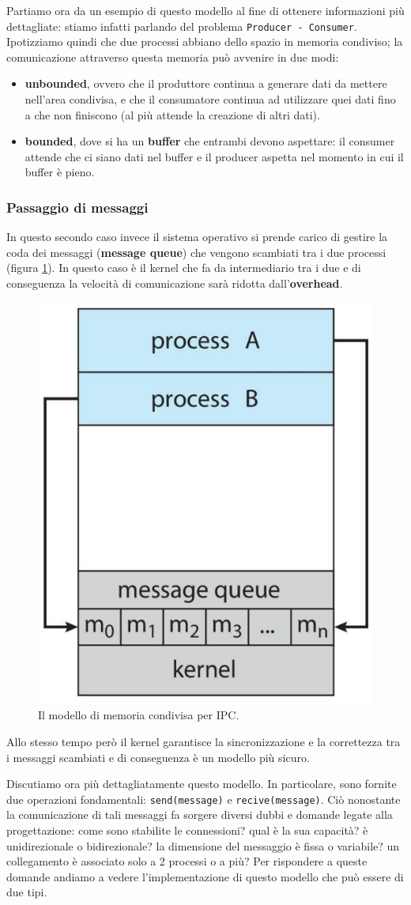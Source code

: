 Partiamo ora da un esempio di questo modello al fine di ottenere informazioni più dettagliate: stiamo infatti parlando del problema \texttt{Producer - Consumer}. Ipotizziamo quindi che due processi abbiano dello spazio in memoria condiviso; la comunicazione attraverso questa memoria può avvenire in due modi:
\vspace{-5px}
\begin{itemize}
\setlength{\itemsep}{-.15 em}
    \item \textbf{unbounded}, ovvero che il produttore continua a generare dati da mettere nell'area condivisa, e che il consumatore continua ad utilizzare quei dati fino a che non finiscono (al più attende la creazione di altri dati).
    \item \textbf{bounded}, dove si ha un \textbf{buffer} che entrambi devono aspettare: il consumer attende che ci siano dati nel buffer e il producer aspetta nel momento in cui il buffer è pieno. 
\end{itemize}

% 
\subsubsection{Passaggio di messaggi}
In questo secondo caso invece il sistema operativo si prende carico di gestire la coda dei messaggi (\textbf{message queue}) che vengono scambiati tra i due processi (figura \ref{fig:message_passing}). In questo caso è il kernel che fa da intermediario tra i due e di conseguenza la velocità di comunicazione sarà ridotta dall'\textbf{overhead}.
\begin{figure}[h]
    \centering
    \includegraphics[width = .25\textwidth]{../res/imgs/processes/message_passing.png}
    \caption{Il modello di memoria condivisa per IPC.}
    \label{fig:message_passing}
\end{figure}
Allo stesso tempo però il kernel garantisce la sincronizzazione e la correttezza tra i messaggi scambiati e di conseguenza è un modello più sicuro. 

Discutiamo ora più dettagliatamente questo modello. In particolare, sono fornite due operazioni fondamentali: \texttt{send(message)} e \texttt{recive(message)}. Ciò nonostante la comunicazione di tali messaggi fa sorgere diversi dubbi e domande legate alla progettazione: come sono stabilite le connessioni? qual è la sua capacità? è unidirezionale o bidirezionale? la dimensione del messaggio è fissa o variabile? un collegamento è associato solo a 2 processi o a più? Per rispondere a queste domande andiamo a vedere l'implementazione di questo modello che può essere di due tipi.

